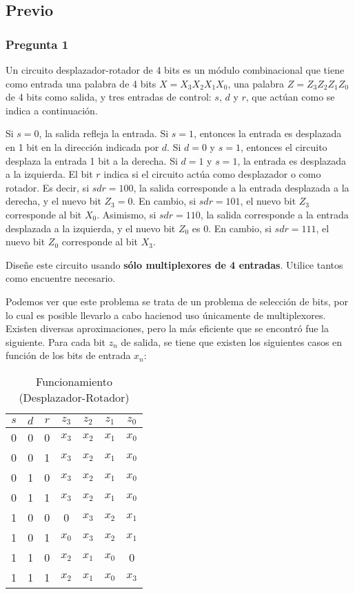 \documentclass[../procedimientos.tex]{subfiles}
\begin{document}
\subsection{Previo} \label{subs:previo}
\subsubsection*{Pregunta 1}
\begin{em}
  Un circuito desplazador-rotador de 4 bits es un módulo combinacional que 
  tiene como entrada una palabra de 4 bits $X=X_3X_2X_1X_0$, una palabra 
  $Z=Z_3Z_2Z_1Z_0$ de 4 bits como salida, y tres entradas de control: $s$, $d$  
  y $r$, que actúan como se indica a continuación.

  Si $s=0$, la salida refleja la entrada. Si $s=1$, entonces la entrada es 
  desplazada en 1 bit en la dirección indicada por $d$. Si $d=0$ y $s=1$, 
  entonces el circuito desplaza la entrada 1 bit a la derecha.  Si $d=1$ y 
  $s=1$, la entrada es desplazada a la izquierda. El bit $r$ indica si el 
  circuito actúa como desplazador o como rotador. Es decir, si $sdr=100$, la 
  salida corresponde a la entrada desplazada a la derecha, y el nuevo bit 
  $Z_3=0$. En cambio, si $sdr=101$, el nuevo bit $Z_3$ corresponde al bit 
  $X_0$.  Asimismo, si $sdr=110$, la salida corresponde a la entrada 
  desplazada a la izquierda, y el nuevo bit $Z_0$ es $0$. En cambio, si 
  $sdr=111$, el nuevo bit $Z_0$ corresponde al bit $X_3$.

  Diseñe este circuito usando \textbf{sólo multiplexores de 4 entradas}.  
  Utilice tantos como encuentre necesario.
\end{em}

Podemos ver que este problema se trata de un problema de selección de bits, 
por lo cual es posible llevarlo a cabo hacienod uso únicamente de 
multiplexores. Existen diversas aproximaciones, pero la más eficiente que se 
encontró fue la siguiente. Para cada bit $z_n$ de salida, se tiene que existen 
los siguientes casos en función de los bits de entrada $x_n$:
\begin{table}[H]
  \centering
  \begin{tabular}{ccc|cccc}
    $s$ & $d$ & $r$ & $z_3$ & $z_2$ & $z_1$ & $z_0$\\
    \hline
    0 & 0 & 0 & $x_3$ & $x_2$ & $x_1$ & $x_0$\\
    0 & 0 & 1 & $x_3$ & $x_2$ & $x_1$ & $x_0$\\
    0 & 1 & 0 & $x_3$ & $x_2$ & $x_1$ & $x_0$\\
    0 & 1 & 1 & $x_3$ & $x_2$ & $x_1$ & $x_0$\\
    1 & 0 & 0 & 0     & $x_3$ & $x_2$ & $x_1$\\
    1 & 0 & 1 & $x_0$ & $x_3$ & $x_2$ & $x_1$\\
    1 & 1 & 0 & $x_2$ & $x_1$ & $x_0$ & 0    \\
    1 & 1 & 1 & $x_2$ & $x_1$ & $x_0$ & $x_3$
  \end{tabular}
  \caption{Funcionamiento (Desplazador-Rotador)}
  \label{tab:previo1_func}
\end{table}
\end{document}
